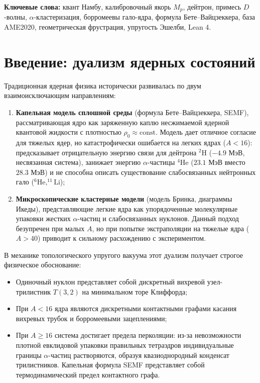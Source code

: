\documentclass[11pt,a4paper]{article}
\theoremstyle{definition}
\theoremstyle{remark}
\begin{document}
\vspace{2mm}
\noindent\textbf{Ключевые слова:} квант Намбу, калибровочный якорь $M_p$, дейтрон, примесь $D$-волны, $\alpha$-кластеризация, борромеевы гало-ядра, формула Бете--Вайцзеккера, база AME2020, геометрическая фрустрация, упругость Эшелби, Lean 4.

\section{Введение: дуализм ядерных состояний}
Традиционная ядерная физика исторически развивалась по двум взаимоисключающим направлениям:
\begin{enumerate}
    \item \textbf{Капельная модель сплошной среды} (формула Бете--Вайцзеккера, SEMF), рассматривающая ядро как заряженную каплю несжимаемой ядерной квантовой жидкости с плотностью $\rho_0 \approx \mathrm{const}$. Модель дает отличное согласие для тяжелых ядер, но катастрофически ошибается на легких ядрах ($A < 16$): предсказывает отрицательную энергию связи для дейтрона $^2\mathrm{H}$ ($-4.9\text{ МэВ}$, несвязанная система), занижает энергию $\alpha$-частицы $^4\mathrm{He}$ ($23.1\text{ МэВ}$ вместо $28.3\text{ МэВ}$) и не способна описать существование слабосвязанных нейтронных гало ($^6\mathrm{He}, ^{11}\mathrm{Li}$);
    \item \textbf{Микроскопические кластерные модели} (модель Бринка, диаграммы Икеды), представляющие легкие ядра как упорядоченные молекулярные упаковки жестких $\alpha$-частиц и слабосвязанных нуклонов. Данный подход безупречен при малых $A$, но при попытке экстраполяции на тяжелые ядра ($A > 40$) приводит к сильному расхождению с экспериментом.
\end{enumerate}

В механике топологического упругого вакуума этот дуализм получает строгое физическое обоснование:
\begin{itemize}
    \item Одиночный нуклон представляет собой дискретный вихревой узел-трилистник $T(3,2)$ на минимальном торе Клиффорда;
    \item При $A < 16$ ядра являются дискретными контактными графами касания вихревых трубок и борромеевыми зацеплениями;
    \item При $A \ge 16$ система достигает предела перколяции: из-за невозможности плотной евклидовой упаковки правильных тетраэдров индивидуальные границы $\alpha$-частиц растворяются, образуя квазиоднородный конденсат трилистников. Капельная формула SEMF представляет собой термодинамический предел контактного графа.
\end{itemize}
\end{document}
